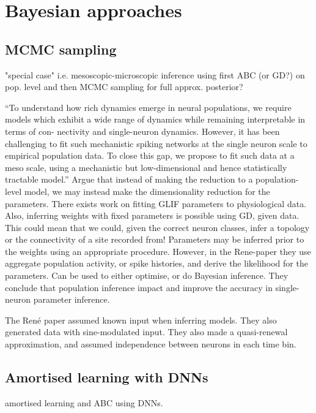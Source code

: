 \documentclass[mphil,deptreport,ai]{infthesis} %
\begin{document}


\section{Bayesian approaches}

\subsection{MCMC sampling}
\cite{Rene2020} "special case" i.e. mesoscopic-microscopic inference using first ABC (or GD?) on pop. level and then MCMC sampling for full approx. posterior?

“To understand how rich dynamics emerge in neural populations, we require models which exhibit a wide range of dynamics while remaining interpretable in terms of con- nectivity and single-neuron dynamics. However, it has been challenging to fit such mechanistic spiking networks at the single neuron scale to empirical population data. To close this gap, we propose to fit such data at a meso scale, using a mechanistic but low-dimensional and hence statistically tractable model.”
Argue that instead of making the reduction to a population-level model, we may instead make the dimensionality reduction for the parameters.
There exists work on fitting GLIF parameters to physiological data. 
Also, inferring weights with fixed parameters is possible using GD, given data.
This could mean that we could, given the correct neuron classes, infer a topology or the connectivity of a site recorded from!
Parameters may be inferred prior to the weights using an appropriate procedure.
However, in the Rene-paper they use aggregate population activity, or spike histories, and derive the likelihood for the parameters. Can be used to either optimise, or do Bayesian inference.
They conclude that population inference impact and improve the accuracy in single-neuron parameter inference.

The René paper assumed known input when inferring models. They also generated data with sine-modulated input.
They also made a quasi-renewal approximation, and assumed independence between neurons in each time bin.


\subsection{Amortised learning with DNNs}
\cite{Lueckmann2018} amortised learning and ABC using DNNs.
\end{document}
